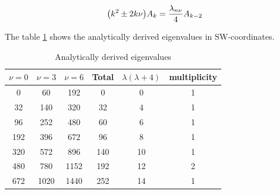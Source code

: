 \begin{equation}
\big(k^{2} \pm 2k\nu\big)A_{k} = \frac{\lambda_{n\nu}}{4} A_{k-2}\\
\end{equation} 

The table \ref{table:1} shows the analytically derived eigenvalues in SW-coordinates.

\begin{table}[h!]
	\centering
	\begin{tabular}{||c c c c c c||} 
		\hline
		$\nu=0$ & $\nu=3$ & $\nu=6$ & Total & $\lambda(\lambda+4)$& multiplicity \\ [0.5ex] 
		\hline\hline
		0		& 60     & 192 & 0 & 0 & 1  \\ 
		32	   & 140   & 320 & 32 & 4 & 1  \\
		96     & 252  & 480 & 60 & 6 & 1  \\
		192   & 396  & 672  & 96 & 8 & 1  \\
		320   & 572  & 896  & 140 & 10 & 1  \\
		480   & 780  & 1152 & 192 & 12 & 2  \\  
		672   & 1020 & 1440 & 252 & 14 & 1  \\ [1ex] 
		\hline
	\end{tabular}
	\caption{Analytically derived eigenvalues}
	\label{table:1}
\end{table} 